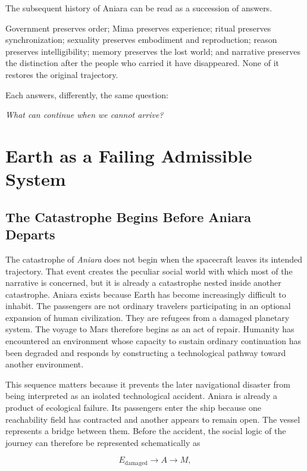 \documentclass[11pt,oneside]{book}
\theoremstyle{definition}
\theoremstyle{remark}
\begin{document}
The subsequent history of Aniara can be read as a succession of answers.

Government preserves order; Mima preserves experience; ritual preserves synchronization; sexuality preserves embodiment and reproduction; reason preserves intelligibility; memory preserves the lost world; and narrative preserves the distinction after the people who carried it have disappeared. None of it restores the original trajectory.

Each answers, differently, the same question:

\begin{center}
\emph{What can continue when we cannot arrive?}
\end{center}

\chapter{Earth as a Failing Admissible System}

\section{The Catastrophe Begins Before Aniara Departs}

The catastrophe of \emph{Aniara} does not begin when the spacecraft leaves its intended trajectory. That event creates the peculiar social world with which most of the narrative is concerned, but it is already a catastrophe nested inside another catastrophe. Aniara exists because Earth has become increasingly difficult to inhabit. The passengers are not ordinary travelers participating in an optional expansion of human civilization. They are refugees from a damaged planetary system. The voyage to Mars therefore begins as an act of repair. Humanity has encountered an environment whose capacity to sustain ordinary continuation has been degraded and responds by constructing a technological pathway toward another environment.

This sequence matters because it prevents the later navigational disaster from being interpreted as an isolated technological accident. Aniara is already a product of ecological failure. Its passengers enter the ship because one reachability field has contracted and another appears to remain open. The vessel represents a bridge between them. Before the accident, the social logic of the journey can therefore be represented schematically as

\[
E_{\mathrm{damaged}}
\longrightarrow
A
\longrightarrow
M,
\]
\end{document}
